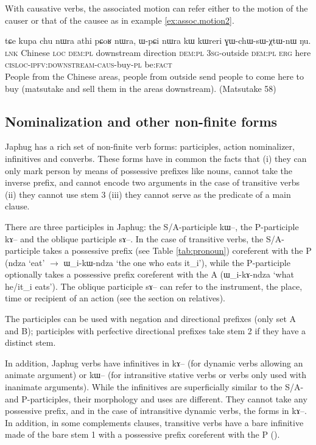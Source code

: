 \documentclass[oldfontcommands,oneside,a4paper,11pt]{article}
\newcommand{\ipa}[1]{{\phon#1}} %
\begin{document}
With causative verbs, the associated motion can refer either to the motion of the causer or that of the causee as in example \ref{ex:assoc.motion2}.

  \begin{exe}
\ex \label{ex:assoc.motion2}
\gll
\ipa{tɕe} 	\ipa{kupa} 	\ipa{chu} 	\ipa{nɯra} 	\ipa{athi} 	\ipa{pɕoʁ} 	\ipa{nɯra,} 	\ipa{ɯ-pɕi} 	\ipa{nɯra} 	\ipa{kɯ} 	\ipa{kɯreri} 	\ipa{ɣɯ-chɯ-sɯ-χtɯ-nɯ} 	\ipa{ŋu.}  \\
\textsc{lnk} Chinese \textsc{loc} \textsc{dem:pl} downstream direction \textsc{dem:pl} \textsc{3sg}-outside  \textsc{dem:pl}  \textsc{erg} here \textsc{cisloc-ipfv:downstream-caus}-buy-\textsc{pl} be:\textsc{fact} \\
\glt People from the Chinese areas, people from outside send people to come here to buy (matsutake and sell them in the areas downstream). (Matsutake 58)
  \end{exe} 


\subsection{Nominalization and other non-finite forms}

Japhug has a rich set of non-finite verb forms: participles, action nominalizer, infinitives and converbs. These forms have in common the facts that (i) they can only mark person by means of possessive prefixes like nouns, cannot take the inverse prefix, and cannot encode two arguments in the case of transitive verbs (ii) they cannot use stem 3 (iii) they cannot serve as the predicate of a main clause.

There are three participles in Japhug: the S/A-participle \ipa{kɯ--}, the P-participle \ipa{kɤ--} and the oblique participle \ipa{sɤ--}. In the case of transitive verbs, the S/A-participle takes a possessive prefix (see Table \ref{tab:pronoun}) coreferent with the P (\ipa{ndza} `eat' $\rightarrow$ \ipa{ɯ_i-kɯ-ndza} `the one who eats it_i'), while the P-participle optionally takes a possessive prefix coreferent with the A (\ipa{ɯ_i-kɤ-ndza} `what he/it_i eats'). The oblique participle \ipa{sɤ--} can refer to  the instrument, the place, time or recipient of an action (see the section on relatives).

The participles can be used with negation and directional prefixes (only set A and B); participles with perfective directional prefixes take stem 2 if they have a distinct stem.

In addition, Japhug verbs have infinitives in \ipa{kɤ--} (for dynamic verbs allowing an animate argument) or \ipa{kɯ--} (for intransitive stative verbs or verbs only used with inanimate arguments). While the infinitives are superficially similar to the S/A- and P-participles, their morphology and uses are different. They cannot take any possessive prefix, and in the case of intransitive dynamic verbs, the forms in \ipa{kɤ--}. In addition, in some complements clauses, transitive verbs have a bare infinitive made of the bare stem 1 with a possessive prefix coreferent with the P (\citealt{jacques14antipassive}).
\end{document}
